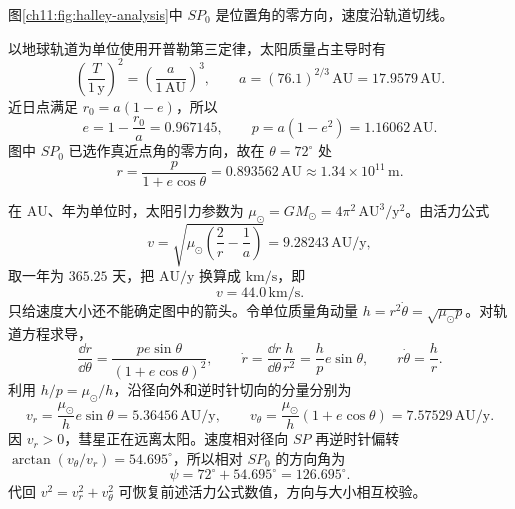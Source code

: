 \begin{xesolution}
图\ref{ch11:fig:halley-analysis}中 $SP_0$ 是位置角的零方向，速度沿轨道切线。
\begin{center}
\label{ch11:fig:halley-analysis}
\end{center}
以地球轨道为单位使用开普勒第三定律，太阳质量占主导时有
\[
 \left(\frac{T}{1\,\mathrm y}\right)^2
 =\left(\frac{a}{1\,\mathrm{AU}}\right)^3,
 \qquad
 a=(76.1)^{2/3}\,\mathrm{AU}=17.9579\,\mathrm{AU}.
\]
近日点满足 $r_0=a(1-e)$，所以
\[
 e=1-\frac{r_0}{a}=0.967145,
 \qquad
 p=a(1-e^2)=1.16062\,\mathrm{AU}.
\]
图中 $SP_0$ 已选作真近点角的零方向，故在 $\theta=72^\circ$ 处
\[
 \boxed{r=\frac{p}{1+e\cos\theta}=0.893562\,\mathrm{AU}}
 \approx1.34\times10^{11}\,\mathrm m.
\]

在 $\mathrm{AU}$、年为单位时，太阳引力参数为
$\mu_\odot=GM_\odot=4\pi^2\,\mathrm{AU^3/y^2}$。由活力公式
\[
 v=\sqrt{\mu_\odot\left(\frac2r-\frac1a\right)}
   =9.28243\,\mathrm{AU/y},
\]
取一年为 $365.25$ 天，把 $\mathrm{AU/y}$ 换算成 $\mathrm{km/s}$，即
\[
 \boxed{v=44.0\,\mathrm{km/s}}.
\]
只给速度大小还不能确定图中的箭头。令单位质量角动量
$h=r^2\dot\theta=\sqrt{\mu_\odot p}$。对轨道方程求导，
\[
 \frac{\dd r}{\dd\theta}=\frac{pe\sin\theta}{(1+e\cos\theta)^2},\qquad
 \dot r=\frac{\dd r}{\dd\theta}\frac h{r^2}=\frac h p e\sin\theta,\qquad
 r\dot\theta=\frac h r.
\]
利用 $h/p=\mu_\odot/h$，沿径向外和逆时针切向的分量分别为
\[
 v_r=\frac{\mu_\odot}{h}e\sin\theta=5.36456\,\mathrm{AU/y},
 \qquad
 v_\theta=\frac{\mu_\odot}{h}(1+e\cos\theta)=7.57529\,\mathrm{AU/y}.
\]
因 $v_r>0$，彗星正在远离太阳。速度相对径向 $SP$ 再逆时针偏转
$\arctan(v_\theta/v_r)=54.695^\circ$，所以相对 $SP_0$ 的方向角为
\[
 \boxed{\psi=72^\circ+54.695^\circ=126.695^\circ}.
\]
代回 $v^2=v_r^2+v_\theta^2$ 可恢复前述活力公式数值，方向与大小相互校验。
\end{xesolution}


